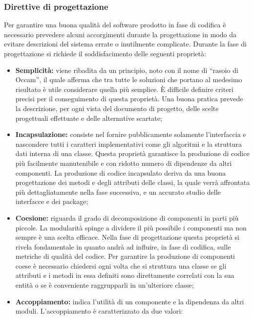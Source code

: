     \subsubsection{Direttive di progettazione}
     Per garantire una buona qualità del software prodotto in fase di codifica è necessario prevedere alcuni accorgimenti durante la progettazione in modo da evitare descrizioni del sistema errate o inutilmente complicate. Durante la fase di progettazione si richiede il soddisfacimento delle seguenti proprietà:
     \begin{itemize}
     
     
     \item \textbf{Semplicità:} viene ribadita da un principio, noto con il nome di “rasoio di Occam”, il quale afferma che tra tutte le soluzioni che portano al medesimo risultato è utile considerare quella più semplice. È difficile definire criteri precisi per il conseguimento di questa proprietà. Una buona pratica prevede la  descrizione, per ogni vista del documento di progetto, delle scelte progettuali
     effettuate e delle alternative scartate;
     \item \textbf{Incapsulazione:} consiste nel fornire pubblicamente solamente l’interfaccia e  nascondere tutti i caratteri implementativi come gli algoritmi e la struttura  dati interna di una classe. Questa proprietà garantisce la produzione di codice più facilmente manutenibile e con ridotto numero di dipendenze da altri componenti. La produzione di codice incapsulato deriva da una buona progettazione dei metodi e degli attributi delle classi, la quale verrà affrontata più dettagliatamente nella fase successiva, e un accurato studio delle interfacce e dei package;
     \item \textbf{Coesione:} riguarda il grado di decomposizione di componenti in parti più piccole. La modularità spinge a dividere il più possibile i componenti ma non sempre è una scelta efficace. Nella fase di progettazione questa proprietà si rivela fondamentale in quanto andrà ad influire, in fase di codifica, sulle metriche di  qualità del codice. Per garantire la produzione di componenti coese è necessario chiedersi ogni volta che si struttura una classe se gli attributi e i metodi in essa definiti sono direttamente correlati con la sua entità o se è conveniente raggrupparli in un’ulteriore classe;
     \item \textbf{Accoppiamento:} indica l’utilità di un componente e la dipendenza da altri moduli. L’accoppiamento è caratterizzato da due valori:
     \begin{itemize}


\end{itemize}
\end{itemize}
